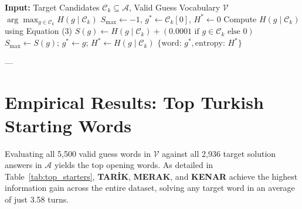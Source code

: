 \documentclass[11pt,a4paper]{article}
\begin{document}
\begin{algorithm}[H]
\caption{Optimal Best Word Finder $\text{findBestWord}(\mathcal{C}_k, \mathcal{V})$}
\begin{algorithmic}[1]
\State \textbf{Input:} Target Candidates $\mathcal{C}_k \subseteq \mathcal{A}$, Valid Guess Vocabulary $\mathcal{V}$
    \State \Return $\arg\max_{g \in \mathcal{C}_k} H(g \mid \mathcal{C}_k)$
\EndIf
\State $S_{\max} \gets -1$, $g^* \gets \mathcal{C}_k[0]$, $H^* \gets 0$
    \State Compute $H(g \mid \mathcal{C}_k)$ using Equation (3)
    \State $S(g) \gets H(g \mid \mathcal{C}_k) + (0.0001 \text{ if } g \in \mathcal{C}_k \text{ else } 0)$
        \State $S_{\max} \gets S(g)$; $g^* \gets g$; $H^* \gets H(g \mid \mathcal{C}_k)$
    \EndIf
\EndFor
\State \Return $\{ \text{word: } g^*, \text{entropy: } H^* \}$
\end{algorithmic}
\end{algorithm}

---

\section{Empirical Results: Top Turkish Starting Words}

Evaluating all 5,500 valid guess words in $\mathcal{V}$ against all 2,936 target solution answers in $\mathcal{A}$ yields the top opening words. As detailed in Table~\ref{tab:top_starters}, \textbf{TARİK}, \textbf{MERAK}, and \textbf{KENAR} achieve the highest information gain across the entire dataset, solving any target word in an average of just 3.58 turns.
\end{document}
